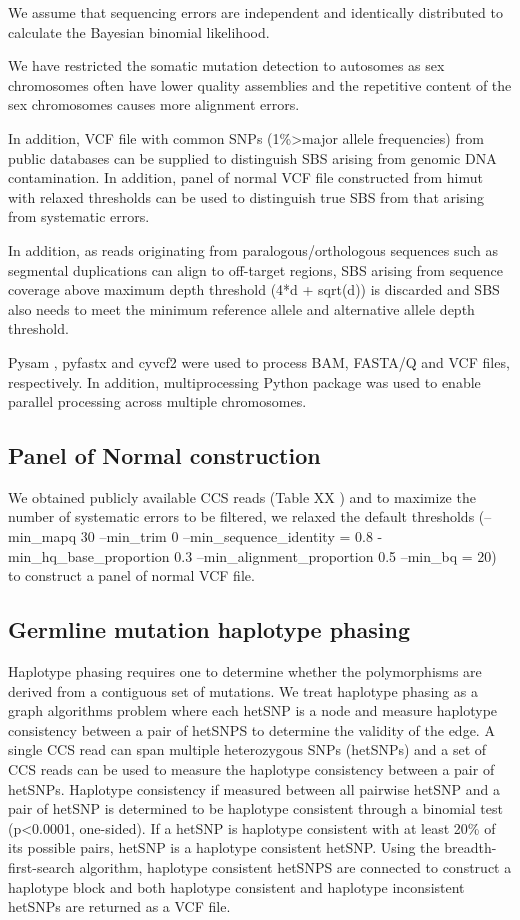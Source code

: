 We assume that sequencing errors are independent and identically distributed to calculate the Bayesian binomial likelihood. 

We have restricted the somatic mutation detection to autosomes as sex chromosomes often have lower quality assemblies and the repetitive content of the sex chromosomes causes more alignment errors. 

In addition, VCF file with common SNPs (1\%>major allele frequencies) from public databases can be supplied to distinguish SBS arising from genomic DNA contamination. In addition, panel of normal VCF file constructed from himut with relaxed thresholds can be used to distinguish true SBS from that arising from systematic errors.  

In addition, as reads originating from paralogous/orthologous sequences such as segmental duplications can align to off-target regions, SBS arising from sequence coverage above maximum depth threshold (4*d + sqrt(d)) is discarded and SBS also needs to meet the minimum reference allele and alternative allele depth threshold. 

Pysam \cite{}, pyfastx \cite{Du2021-ya} and cyvcf2 \cite{Pedersen2017-ld} were used to process BAM, FASTA/Q and VCF files, respectively. In addition, multiprocessing \cite{} Python package was used to enable parallel processing across multiple chromosomes. 

\subsection{Panel of Normal construction}

We obtained publicly available CCS reads (Table XX ) and to maximize the number of systematic errors to be filtered, we relaxed the default thresholds (--min\_mapq 30 --min\_trim 0 --min\_sequence\_identity = 0.8 -min\_hq\_base\_proportion 0.3 --min\_alignment\_proportion 0.5 --min\_bq = 20) to construct a panel of normal VCF file. 

\subsection{Germline mutation haplotype phasing}

Haplotype phasing requires one to determine whether the polymorphisms are derived from a contiguous set of mutations. We treat haplotype phasing as a graph algorithms problem where each hetSNP is a node and measure haplotype consistency between a pair of hetSNPS to determine the validity of the edge. A single CCS read can span multiple heterozygous SNPs (hetSNPs) and a set of CCS reads can be used to measure the haplotype consistency between a pair of hetSNPs. Haplotype consistency if measured between all pairwise hetSNP and a pair of hetSNP is determined to be haplotype consistent through a binomial test (p<0.0001, one-sided). If a hetSNP is haplotype consistent with at least 20\% of its possible pairs, hetSNP is a haplotype consistent hetSNP. Using the breadth-first-search algorithm, haplotype consistent hetSNPS are connected to construct a haplotype block and both haplotype consistent and haplotype inconsistent hetSNPs are returned as a VCF file. 

